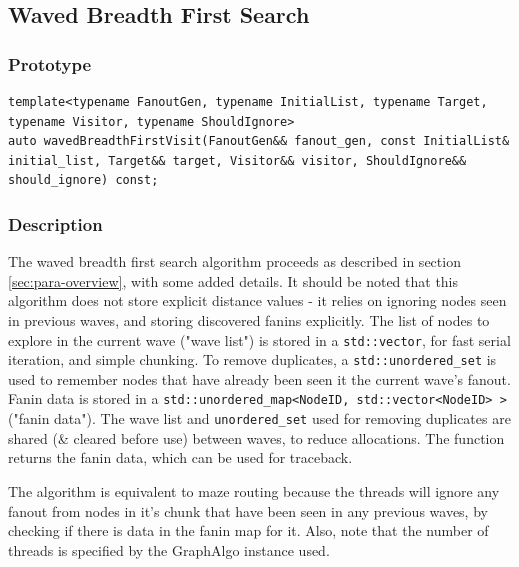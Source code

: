 \documentclass[11pt]{article}
\begin{document}
\subsection{Waved Breadth First Search}\label{sec:wbfs-detail}
\subsubsection{Prototype} 
\begin{lstlisting}
template<typename FanoutGen, typename InitialList, typename Target, typename Visitor, typename ShouldIgnore>
auto wavedBreadthFirstVisit(FanoutGen&& fanout_gen, const InitialList& initial_list, Target&& target, Visitor&& visitor, ShouldIgnore&& should_ignore) const;
\end{lstlisting}

\subsubsection{Description}
The waved breadth first search algorithm proceeds as described in section \ref{sec:para-overview}, with some added details. It should be noted that this algorithm does not store explicit distance values - it relies on ignoring nodes seen in previous waves, and storing discovered fanins explicitly. The list of nodes to explore in the current wave ("wave list") is stored in a \texttt{std::vector}, for fast serial iteration, and simple chunking. To remove duplicates, a \texttt{std::unordered_set} is used to remember nodes that have already been seen it the current wave's fanout. Fanin data is stored in a \texttt{std::unordered_map<NodeID, std::vector<NodeID> >} ("fanin data"). The wave list and \texttt{unordered_set} used for removing duplicates are shared (\& cleared before use) between waves, to reduce allocations. The function returns the fanin data, which can be used for traceback.

The algorithm is equivalent to maze routing because the threads will ignore any fanout from nodes in it's chunk that have been seen in any previous waves, by checking if there is data in the fanin map for it. Also, note that the number of threads is specified by the GraphAlgo instance used.
\end{document}
